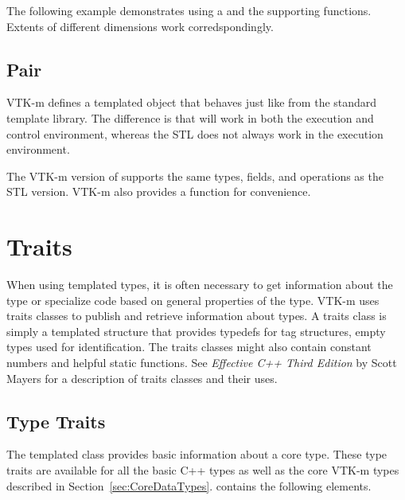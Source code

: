 The following example demonstrates using a  and the
supporting functions. Extents of different dimensions work
corredspondingly.


\subsection{Pair}

VTK-m defines a  templated object that
behaves just like  from the standard template
library. The difference is that  will work in both the execution
and control environment, whereas the STL  does not
always work in the execution environment.

The VTK-m version of  supports the same types, fields, and
operations as the STL version. VTK-m also provides a 
function for convenience.

\section{Traits}
\label{sec:Traits}


When using templated types, it is often necessary to get information about
the type or specialize code based on general properties of the type. VTK-m
uses traits classes to publish and retrieve information about types. A
traits class is simply a templated structure that provides typedefs for
tag structures, empty types used for identification. The traits
classes might also contain constant numbers and helpful static
functions. See {\it Effective C++ Third Edition} by Scott Mayers for a
description of traits classes and their uses.

\subsection{Type Traits}

The  templated class provides basic information
about a core type. These type traits are available for all the basic C++
types as well as the core VTK-m types described in
Section~\ref{sec:CoreDataTypes}.  contains the following
elements.


